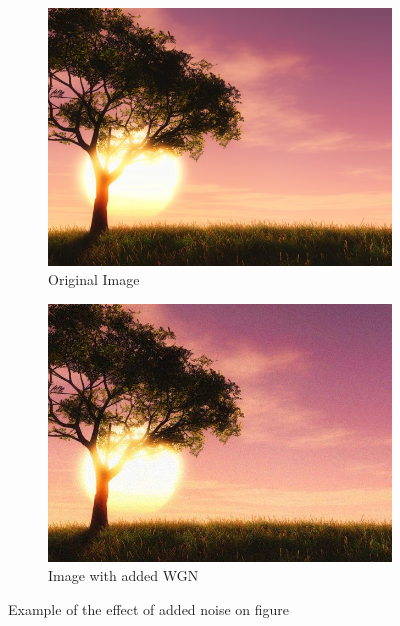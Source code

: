 \begin{figure}[h]
    \centering
    \begin{subfigure}[c]{\textwidth}
        \centering
        \includegraphics[width=\figwidth]{Sections/3AV1/Diagrams/paisagemOri.jpg}
        \caption{Original Image}
        \label{subfig:noiseOri}
    \end{subfigure}
    \begin{subfigure}[c]{\textwidth}
        \centering
        \includegraphics[width=\figwidth]{Sections/3AV1/Diagrams/paisagemNoise.jpg}
        \caption{Image with added WGN}
        \label{subfig:noise}
    \end{subfigure}
    \caption{Example of the effect of added noise on figure}
    \label{fig:noise}
\end{figure}


